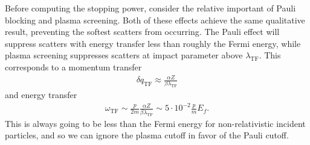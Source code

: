 \documentclass[preprintnumbers,amsmath,amssymb,prd, superscriptaddress,twocolumn]{revtex4}
\begin{document}
\begin{appendices}
Before computing the stopping power, consider the relative important of Pauli blocking and plasma screening.
Both of these effects achieve the same qualitative result, preventing the softest scatters from occurring.
The Pauli effect will suppress scatters with energy transfer less than roughly the Fermi energy, while plasma screening suppresses scatters at impact parameter above $\lambda_\text{TF}$.
This corresponds to a momentum transfer
\begin{align}
      \delta q_\text{TF} \approx \frac{\alpha Z}{\beta \lambda_\text{TF}}
\end{align}
and energy transfer
\begin{align}
  \label{eq:cuttoff_compare}
  \omega_\text{TF} \sim \frac{p}{2m} \frac{\alpha Z}{\beta \lambda_\text{TF}}
         \sim 5 \cdot 10^{-2} \frac{p}{m} E_f.
\end{align}
This is always going to be less than the Fermi energy for non-relativistic incident particles, and so we can ignore the plasma cutoff in favor of the Pauli cutoff.


\end{appendices}
\end{document}
